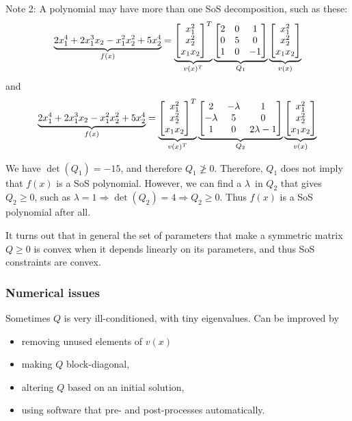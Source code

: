 Note 2: A polynomial may have more than one SoS decomposition, such as these:
%
\begin{equation}
  \underbrace{2x_1^4 + 2x_1^3x_2 - x_1^2x_2^2 + 5x_2^4}_{f(x)}
  =
  \underbrace{\begin{bmatrix} x_1^2 \\ x_2^2 \\ x_1x_2 \end{bmatrix}^{T}}_{v(x)^{T}}
  \underbrace{\begin{bmatrix} 2 & 0 & 1 \\ 0 & 5 & 0 \\ 1 & 0 & -1 \end{bmatrix}}_{Q_1}
  \underbrace{\begin{bmatrix} x_1^2 \\ x_2^2 \\ x_1x_2 \end{bmatrix}}_{v(x)}
\end{equation}
%
and
%
\begin{equation}
  \underbrace{2x_1^4 + 2x_1^3x_2 - x_1^2x_2^2 + 5x_2^4}_{f(x)}
  =
  \underbrace{\begin{bmatrix} x_1^2 \\ x_2^2 \\ x_1x_2 \end{bmatrix}^{T}}_{v(x)^{T}}
  \underbrace{\begin{bmatrix} 2 & -\lambda & 1 \\ -\lambda & 5 & 0 \\ 1 & 0 & 2\lambda -1 \end{bmatrix}}_{Q_2}
  \underbrace{\begin{bmatrix} x_1^2 \\ x_2^2 \\ x_1x_2 \end{bmatrix}}_{v(x)}
\end{equation}

We have $\det(Q_1) = -15$, and therefore $Q_1 \ngeq 0$. Therefore, $Q_1$ does not imply that $f(x)$ is a SoS polynomial. However, we can find a $\lambda$ in $Q_2$ that gives $Q_2 \geq 0$, such as $\lambda = 1 \Rightarrow \det(Q_2) = 4 \Rightarrow Q_2 \geq 0$. Thus $f(x)$ is a SoS polynomial after all.

It turns out that in general the set of parameters that make a symmetric matrix $Q \geq 0$ is convex when it depends linearly on its parameters, and thus SoS constraints are convex.

\subsubsection{Numerical issues}
Sometimes $Q$ is very ill-conditioned, with tiny eigenvalues. Can be improved by
\begin{itemize}
  \item removing unused elements of $v(x)$
  \item making $Q$ block-diagonal,
  \item altering $Q$ based on an initial solution,
  \item using software that pre- and post-processes automatically.
\end{itemize}

